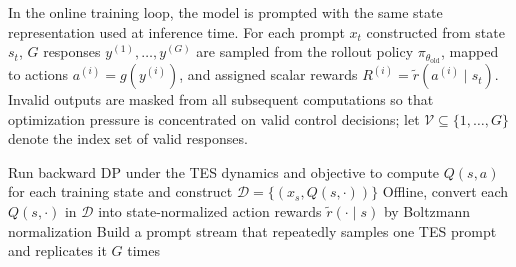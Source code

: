 \documentclass[11pt]{article}
\begin{document}
In the online training loop, the model is prompted with the same state representation used at inference time. For each prompt $x_t$ constructed from state $s_t$, $G$ responses $y^{(1)},\dots,y^{(G)}$ are sampled from the rollout policy $\pi_{\theta_{\mathrm{old}}}$, mapped to actions $a^{(i)}=g(y^{(i)})$, and assigned scalar rewards $R^{(i)}=\tilde r(a^{(i)} \mid s_t)$. Invalid outputs are masked from all subsequent computations so that optimization pressure is concentrated on valid control decisions; let $\mathcal{V} \subseteq \{1,\dots,G\}$ denote the index set of valid responses.
\begin{algorithm}[!t]
\small
\SetAlgoLined
\DontPrintSemicolon
\caption{Verifier-based RFT for TES control}
\label{alg:tes_rft}

Run backward DP under the TES dynamics and objective to compute $Q(s,a)$ for each training state and construct $\mathcal{D}=\{(x_s,Q(s,\cdot))\}$\;
Offline, convert each $Q(s,\cdot)$ in $\mathcal{D}$ into state-normalized action rewards $\tilde r(\cdot \mid s)$ by Boltzmann normalization\;
Build a prompt stream that repeatedly samples one TES prompt and replicates it $G$ times\;
\end{algorithm}
\end{document}
